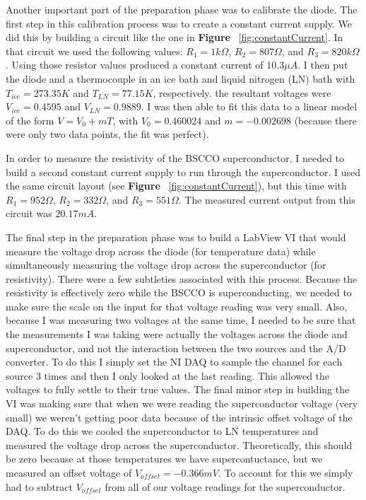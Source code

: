 \documentclass[paper=a4, fontsize=11pt]{scrartcl}
\numberwithin{equation}{section}
\numberwithin{figure}{section}
\numberwithin{table}{section}
\begin{document}
            Another important part of the preparation phase was to calibrate the diode. The first step in this calibration process was to create a constant current supply. We did this by building a circuit like the one in \textbf{Figure} ~\ref{fig:constantCurrent}. In that circuit we used the following values: $R_1 = 1 k \Omega$, $R_2 = 807 \Omega$, and $R_3 = 820 k \Omega$. Using those resistor values produced a constant current of $10.3 \mu A$. I then put the diode and a thermocouple in an ice bath and liquid nitrogen (LN) bath with $T_{ice} = 273.35K$ and $T_{LN} = 77.15K$, respectively. the resultant voltages were $V_{ice} = 0.4595$ and $V_{LN} = 0.9889$. I was then able to fit this data to a linear model of the form $V = V_0 + m T$, with $V_0 = 0.460024$ and $m = -0.002698$ (because there were only two data points, the fit was perfect).

             In order to measure the resistivity of the BSCCO superconductor, I needed to build a second constant current supply to run through the superconductor. I used the same circuit layout (see \textbf{Figure} ~\ref{fig:constantCurrent}), but this time with $R_1 = 952\Omega$, $R_2 = 332 \Omega$, and $R_3 = 551 \Omega$. The measured current output from this circuit was $20.17 mA$.

             The final step in the preparation phase was to build a LabView VI that would measure the voltage drop across the diode (for temperature data) while simultaneously measuring the voltage drop across the superconductor (for resistivity). There were a few subtleties associated with this process. Because the resistivity is effectively zero while the BSCCO is superconducting, we needed to make sure the scale on the input for that voltage reading was very small. Also, because I was measuring two voltages at the same time, I needed to be sure that the measurements I was taking were actually the voltages across the diode and superconductor, and not the interaction between the two sources and the A/D converter. To do this I simply set the NI DAQ to sample the channel for each source 3 times and then I only looked at the last reading. This allowed the voltages to fully settle to their true values. The final minor step in building the VI was making sure that when we were reading the superconductor voltage (very small) we weren't getting poor data because of the intrinsic offset voltage of the DAQ. To do this we cooled the superconductor to LN temperatures and measured the voltage drop across the superconductor. Theoretically, this should be zero because at those temperatures we have supercontuctance, but we measured an offset voltage of $V_{offset} = -0.366 mV$. To account for this we simply had to subtract $V_{offset}$ from all of our voltage readings for the superconductor.
\end{document}
